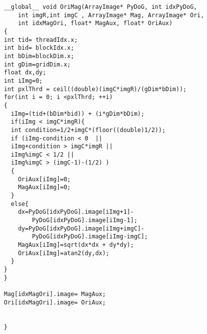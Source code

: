 \begin{small}
\begin{lstlisting}
__global__ void OriMag(ArrayImage* PyDoG, int idxPyDoG,
	int imgR,int imgC , ArrayImage* Mag, ArrayImage* Ori,
	int idxMagOri, float* MagAux, float* OriAux) 
{
int tid= threadIdx.x;
int bid= blockIdx.x;
int bDim=blockDim.x;
int gDim=gridDim.x;
float dx,dy;
int iImg=0;
int pxlThrd = ceil((double)(imgC*imgR)/(gDim*bDim)); 
for(int i = 0; i <pxlThrd; ++i)
{
  iImg=(tid+(bDim*bid)) + (i*gDim*bDim); 
  if(iImg < imgC*imgR){
  int condition=1/2+imgC*(floor((double)1/2));
  if (iImg-condition < 0  ||										
  iImg+condition > imgC*imgR ||								
  iImg%imgC < 1/2 ||										
  iImg%imgC > (imgC-1)-(1/2) )							
  {                  
    OriAux[iImg]=0;
  	MagAux[iImg]=0;
  }
  else{
    dx=PyDoG[idxPyDoG].image[iImg+1]-
  		PyDoG[idxPyDoG].image[iImg-1];
  	dy=PyDoG[idxPyDoG].image[iImg+imgC]-
  		PyDoG[idxPyDoG].image[iImg-imgC];
  	MagAux[iImg]=sqrt(dx*dx + dy*dy);
  	OriAux[iImg]=atan2(dy,dx);
  }
}
}
	
Mag[idxMagOri].image= MagAux;
Ori[idxMagOri].image= OriAux;

	
}
\end{lstlisting}


\end{small}
\pagebreak
